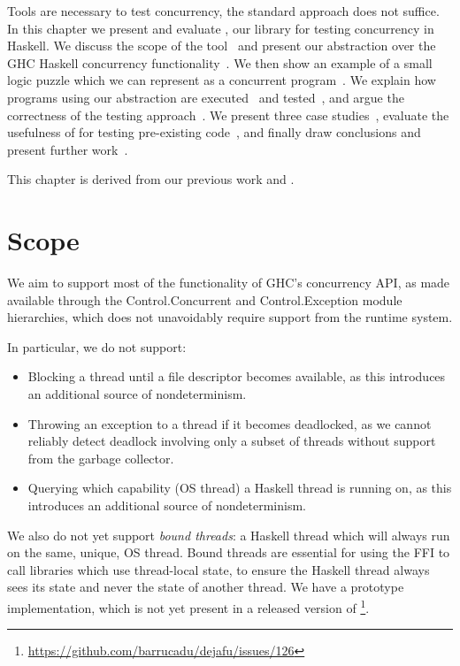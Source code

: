 Tools are necessary to test concurrency, the standard approach does
not suffice.  In this chapter we present and evaluate \dejafu{}, our
library for testing concurrency in Haskell.  We discuss the scope of
the tool~ and present our abstraction over the GHC
Haskell concurrency functionality~.  We then
show an example of a small logic puzzle which we can represent as a
concurrent program~.  We explain how programs using
our abstraction are executed~ and
tested~, and argue the correctness of the testing
approach~.  We present three case
studies~, evaluate the usefulness of
\dejafu{} for testing pre-existing code~, and
finally draw conclusions and present further
work~.

This chapter is derived from our previous work \cite{walker2015} and
\cite{YCS-2016-503}.

\section{Scope}
\label{sec:dejafu-scope}

We aim to support most of the functionality of GHC’s concurrency API, as made
available through the Control.Concurrent and Control.Exception module
hierarchies, which does not unavoidably require support from the runtime system.

In particular, we do not support:

\begin{itemize}
\item Blocking a thread until a file descriptor becomes available, as this
  introduces an additional source of nondeterminism.
\item Throwing an exception to a thread if it becomes deadlocked, as we cannot
  reliably detect deadlock involving only a subset of threads without support
  from the garbage collector.
\item Querying which capability (OS thread) a Haskell thread is running on, as
  this introduces an additional source of nondeterminism.
\end{itemize}

We also do not yet support \emph{bound threads}: a Haskell thread which will
always run on the same, unique, OS thread.  Bound threads are essential for
using the FFI to call libraries which use thread-local state, to ensure the
Haskell thread always sees its state and never the state of another thread.  We
have a prototype implementation, which is not yet present in a released version
of \dejafu{}\footnote{\url{https://github.com/barrucadu/dejafu/issues/126}}.

